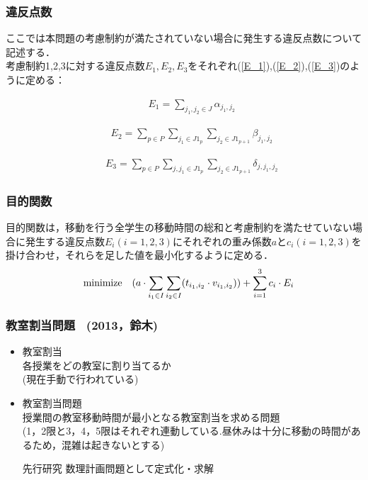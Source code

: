 \documentclass[dvipdfmx,12pt]{beamer}
\begin{document}
\begin{frame}
\frametitle{\LARGE 違反点数}

ここでは本問題の考慮制約が満たされていない場合に発生する違反点数について記述する．\\
考慮制約1,2,3に対する違反点数$E_1,E_2,E_3$をそれぞれ(\ref{E_1}),(\ref{E_2}),(\ref{E_3})のように定める：

\begin{eqnarray}
\label{E_1}
&&E_1= \sum_{j_1,j_2 \in J}\alpha_{j_1,j_2}
\end{eqnarray}


\vspace{-5.0mm}
\begin{eqnarray}
\label{E_2}
&&E_2= \sum_{p \in P}\sum_{j_1 \in J1_{p}}\sum_{j_2 \in J1_{p+1}}\beta_{j_1,j_2}
\end{eqnarray}


\vspace{-5.0mm}
\begin{eqnarray}
\label{E_3}
&&E_3= \sum_{p \in P}\sum_{j,j_1 \in J1_{p}}\sum_{j_2 \in J1_{p+1}}\delta_{j,j_1,j_2}
\end{eqnarray}
\end{frame}

\begin{frame}
\frametitle{ \LARGE 目的関数}


目的関数は，移動を行う全学生の移動時間の総和と考慮制約を満たせていない場合に発生する違反点数$E_i(i=1,2,3)$にそれぞれの重み係数$a$と$c_i(i=1,2,3)$を掛け合わせ，それらを足した値を最小化するように定める．\\


\begin{eqnarray}
&&{\rm minimize} \quad( a \cdot \sum_{i_1 \in I} \sum_{i_2 \in I} (t_{i_1,i_2} \cdot v_{i_1,i_2})) + \sum_{i=1}^{3} c_{i} \cdot E_{i}
\end{eqnarray}
\end{frame}

\begin{frame}\frametitle{教室割当問題 \ (2013，鈴木)}
\begin{itemize}
\item 教室割当\\
\vspace{5pt}
各授業をどの教室に割り当てるか\\
(現在手動で行われている)\\
\item 教室割当問題\\
\vspace{5pt}
授業間の教室移動時間が最小となる教室割当を求める問題\\
(1，2限と3，4，5限はそれぞれ連動している.昼休みは十分に移動の時間があるため，混雑は起きないとする)

\begin{itembox}{先行研究}
数理計画問題として定式化・求解
\end{itembox}
\end{itemize}
\end{frame}
\end{document}
